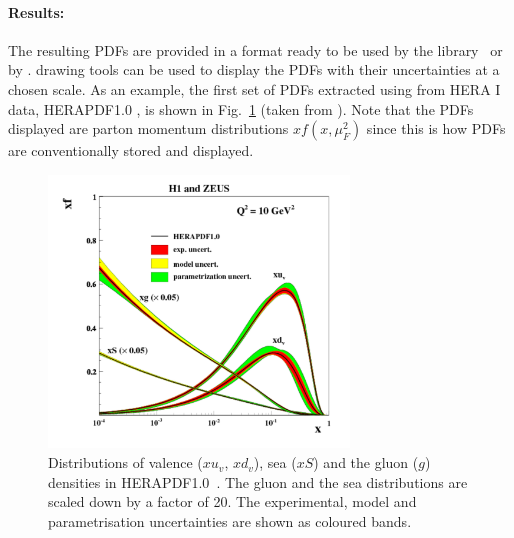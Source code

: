 \paragraph{Results:}
The resulting PDFs are provided in a format ready to be used by the \lhapdf 
library~\cite{lhapdf,lhapdfweb} or by \tmdlib \cite{tmdlref}.
\fitter drawing tools can be used to display the PDFs with their uncertainties at a chosen scale.  
As an example, the first set of PDFs extracted using \fitter from HERA I data, HERAPDF1.0 \cite{h1zeus:2009wt}, 
is shown in Fig.~\ref{fig:hera1} (taken from \cite{h1zeus:2009wt}).
 Note that the PDFs displayed are parton momentum distributions $xf(x,\mu_F^2)$ since this is how PDFs are conventionally stored and displayed.
\begin{figure}[!ht]
   \centering
   \includegraphics[width=8cm]{hera1.pdf}
   \caption{Distributions of valence ($xu_v$, $xd_v$), sea ($xS$) and the gluon ($g$) densities in HERAPDF1.0~\cite{h1zeus:2009wt}. 
       The gluon and the sea distributions are scaled down by a factor of 20.
       The experimental, model and parametrisation uncertainties are shown as coloured bands.}
 \label{fig:hera1}
\end{figure}


